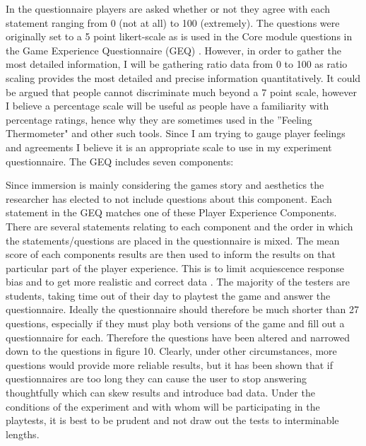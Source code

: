 \documentclass[journal]{IEEEtran}
\begin{document}
In the questionnaire players are asked whether or not they agree with each statement ranging from 0 (not at all) to 100 (extremely). The questions were originally set to a 5 point likert-scale as is used in the Core module questions in the Game Experience Questionnaire (GEQ) \cite{ijsselsteijn2013game}. However, in order to gather the most detailed information, I will be gathering ratio data from 0 to 100 as ratio scaling provides the most detailed and precise information quantitatively. It could be argued that people cannot discriminate much beyond a 7 point scale, however I believe a percentage scale will be useful as people have a familiarity with percentage ratings, hence why they are sometimes used in the ''Feeling Thermometer" and other such tools. Since I am trying to gauge player feelings and agreements I believe it is an appropriate scale to use in my experiment questionnaire. The GEQ includes seven components: 


Since immersion is mainly considering the games story and aesthetics the researcher has elected to not include questions about this component.
Each statement in the GEQ matches one of these Player Experience Components. There are several statements relating to each component and the order in which the statements/questions are placed in the questionnaire is mixed. The mean score of each components results are then used to inform the results on that particular part of the player experience. This is to limit acquiescence response bias and to get more realistic and correct data \cite{winkler1982controlling}. 
The majority of the testers are students, taking time out of their day to playtest the game and answer the questionnaire. Ideally the questionnaire should therefore be much shorter than 27 questions, especially if they must play both versions of the game and fill out a questionnaire for each. Therefore the questions have been altered and narrowed down to the questions in figure 10. Clearly, under other circumstances, more questions would provide more reliable results, but it has been shown that if questionnaires are too long they can cause the user to stop answering thoughtfully which can skew results and introduce bad data. Under the conditions of the experiment and with whom will be participating in the playtests, it is best to be prudent and not draw out the tests to interminable lengths.
\end{document}
